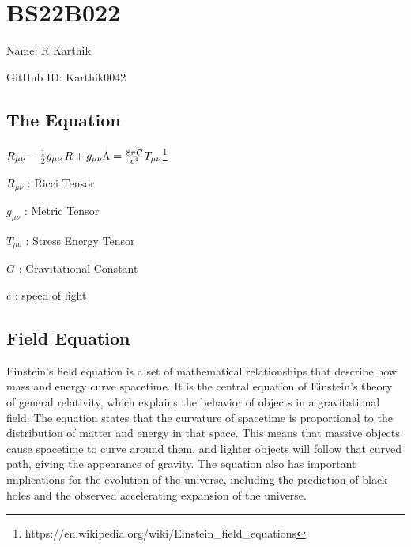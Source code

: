 




\section{BS22B022}
\vspace{2mm}
Name: R Karthik

\vspace{2mm}
GitHub ID: Karthik0042
\subsection{The Equation}
$R_{\mu \nu} - {1 \over 2}g_{\mu \nu}\,R + g_{\mu \nu} \Lambda = 
 {8 \pi G \over c^4} T_{\mu \nu}$\footnote{https://en.wikipedia.org/wiki/Einstein_field_equations}
 
\vspace{5mm} 
 $R_{\mu \nu}$ : Ricci Tensor
 
\vspace{2mm}
$g_{\mu \nu}$ : Metric Tensor

\vspace{2mm}
$T_{\mu \nu}$ : Stress Energy Tensor

\vspace{2mm}
$G$ : Gravitational Constant

\vspace{2mm}
$c$ : speed of light

\vspace{2mm}
\subsection{Field Equation}
Einstein's field equation is a set of mathematical relationships that describe how mass and energy curve spacetime. It is the central equation of Einstein's theory of general relativity, which explains the behavior of objects in a gravitational field. The equation states that the curvature of spacetime is proportional to the distribution of matter and energy in that space. This means that massive objects cause spacetime to curve around them, and lighter objects will follow that curved path, giving the appearance of gravity. The equation also has important implications for the evolution of the universe, including the prediction of black holes and the observed accelerating expansion of the universe.

